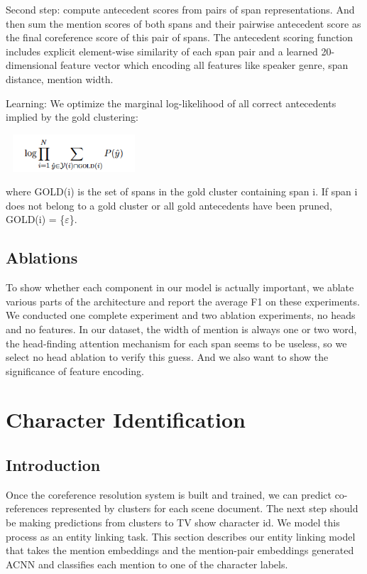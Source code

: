 \documentclass[11pt]{article}
\begin{document}
Second step: compute antecedent scores from pairs of span representations. And then sum the mention scores of both spans and their pairwise antecedent score as the final coreference score of this pair of spans.
The antecedent scoring function includes explicit element-wise similarity of each span pair and a learned 20-dimensional feature vector which encoding all features like speaker genre, span distance, mention width.

Learning: We optimize the marginal log-likelihood of all correct antecedents implied by the gold clustering:

\includegraphics[width=2.00in,height=0.55in]{04.jpg}

where GOLD(i) is the set of spans in the gold cluster containing span i. If span i does not belong to a gold cluster or all gold antecedents have been pruned, GOLD(i) = \{$\varepsilon $\}.

\subsection{Ablations}
To show whether each component in our model is actually important, we ablate various parts of the architecture and report the average F1 on these experiments. We conducted one complete experiment and two ablation experiments, no heads and no features. In our dataset, the width of mention is always one or two word, the head-finding attention mechanism for each span seems to be useless, so we select no head ablation to verify this guess.  And we also want to show the significance of feature encoding.


\section{Character Identification}

\subsection{Introduction}
Once the coreference resolution system is built and trained, we can predict co-references represented by clusters for each scene document. The next step should be making predictions from clusters to TV show character id. We model this process as an entity linking task. This section describes our entity linking model that takes the mention embeddings and the mention-pair embeddings generated ACNN and classifies each mention to one of the character labels.
\end{document}
